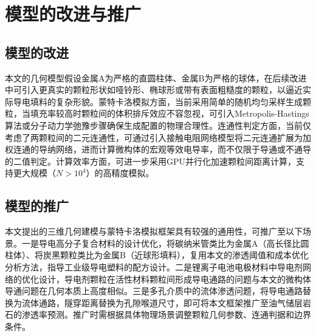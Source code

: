 
\section{模型的改进与推广}

\subsection{模型的改进}

本文的几何模型假设金属A为严格的直圆柱体、金属B为严格的球体，在后续改进中可引入更真实的颗粒形状如哑铃形、椭球形或带有表面粗糙度的颗粒，以逼近实际导电填料的复杂形貌。蒙特卡洛模拟方面，当前采用简单的随机均匀采样生成颗粒，当填充率较高时颗粒间的体积排斥效应不容忽视，可引入Metropolis-Hastings算法或分子动力学弛豫步骤确保生成配置的物理合理性。连通性判定方面，当前仅考虑了两颗粒间的二元连通性，可通过引入接触电阻网络模型将二元连通扩展为加权连通的导纳网络，进而计算微构体的宏观等效电导率，而不仅限于导通或不通导的二值判定。计算效率方面，可进一步采用GPU并行化加速颗粒间距离计算，支持更大规模（$N > 10^4$）的高精度模拟。

\subsection{模型的推广}

本文提出的三维几何建模与蒙特卡洛模拟框架具有较强的通用性，可推广至以下场景。一是导电高分子复合材料的设计优化，将碳纳米管类比为金属A（高长径比圆柱体）、将炭黑颗粒类比为金属B（近球形填料），复用本文的渗透阈值和成本优化分析方法，指导工业级导电塑料的配方设计。二是锂离子电池电极材料中导电剂网络的优化设计，导电剂颗粒在活性材料颗粒间形成导电通路的问题与本文的微构体导通问题在几何本质上高度相似。三是多孔介质中的流体渗透问题，将导电通路替换为流体通路，隧穿距离替换为孔隙喉道尺寸，即可将本文框架推广至油气储层岩石的渗透率预测。推广时需根据具体物理场景调整颗粒几何参数、连通判据和边界条件。
